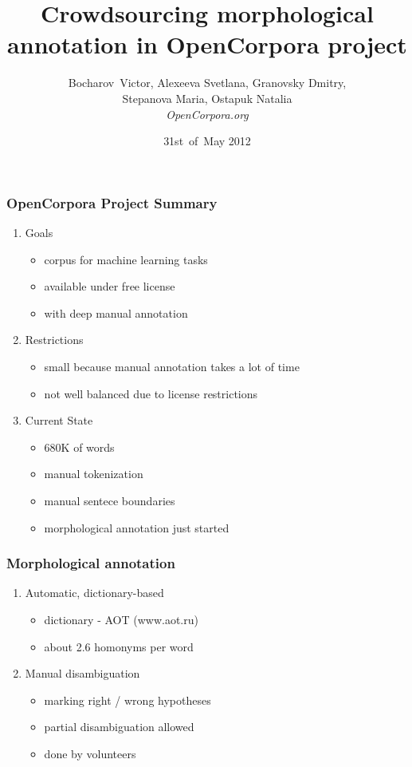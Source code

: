 \documentclass{beamer}
\title{Crowdsourcing morphological annotation in OpenCorpora project}
\author{Bocharov~Victor, Alexeeva Svetlana, Granovsky Dmitry,\\Stepanova Maria, Ostapuk Natalia\\\small\it OpenCorpora.org}
\date{31st~of~May 2012}
\begin{document}
\maketitle

\begin{frame}
\frametitle{OpenCorpora Project Summary}
\begin{enumerate}
\item{Goals}
    \begin{itemize}
    \item{corpus for machine learning tasks}
    \item{available under free license}
    \item{with deep manual annotation}
    \end{itemize}
    \pause
\item{Restrictions}
    \begin{itemize}
    \item{small because manual annotation takes a lot of time}
    \item{not well balanced due to license restrictions}
    \end{itemize}
    \pause
\item{Current State}
    \begin{itemize}
    \item{680K of words}
    \item{manual tokenization}
    \item{manual sentece boundaries}
    \item{morphological annotation just started}
    \end{itemize}
\end{enumerate}
\end{frame}

\begin{frame}
\frametitle{Morphological annotation}
\begin{enumerate}
\item{Automatic, dictionary-based}
    \begin{itemize}
    \item{dictionary - AOT (www.aot.ru)}
    \item{about 2.6 homonyms per word}
    \end{itemize}
\item{Manual disambiguation}
    \begin{itemize}
    \item{marking right / wrong hypotheses}
    \item{partial disambiguation allowed}
    \item{done by volunteers}
    \end{itemize}
\end{enumerate}
\end{frame}
\end{document}
